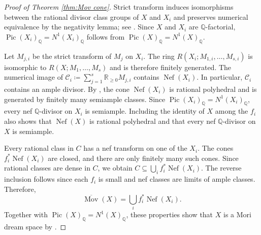 \documentclass[a4paper,12pt]{amsart}
\theoremstyle{plain}
\theoremstyle{definition}
\numberwithin{equation}{section}
\newcommand{\R}{\mathbb{R}}
\newcommand{\Q}{\mathbb{Q}}
\DeclareMathOperator{\Nef}{Nef}
\def\Pic{\operatorname{Pic}}
\def\Mov{\operatorname{Mov}}
\begin{document}
\begin{proof}[Proof of Theorem \ref{thm:Mov cone}]
    Strict transform induces isomorphisms between the rational divisor class groups of $X$ and $X_i$ and preserves numerical equivalence by the negativity lemma; see \cite[Corollary 2.6]{KKL}. Since $X$ and $X_i$ are $\Q$-factorial, $\Pic(X_i)_{\Q}=N^1(X_i)_{\Q}$ follows from $\Pic(X)_{\Q}=N^1(X)_{\Q}$.

    Let $M_{j,i}$ be the strict transform of $M_j$ on $X_i$. The ring $R(X_i;M_{1,i},\ldots,M_{s,i})$ is isomorphic to $R(X;M_1,\ldots,M_s)$ and is therefore finitely generated. The numerical image of $\mathcal C_i\coloneqq\sum_{j=1}^s\R_{\ge0}M_{j,i}$ contains $\Nef(X_i)$. In particular, $\mathcal C_i$ contains an ample divisor. By \cite[Corollary 3.4]{KKL}, the cone $\Nef(X_i)$ is rational polyhedral and is generated by finitely many semiample classes. Since $\Pic(X_i)_{\Q}=N^1(X_i)_{\Q}$, every nef $\Q$-divisor on $X_i$ is semiample. Including the identity of $X$ among the $f_i$ also shows that $\Nef(X)$ is rational polyhedral and that every nef $\Q$-divisor on $X$ is semiample.

    Every rational class in $C$ has a nef transform on one of the $X_i$. The cones $f_i^*\Nef(X_i)$ are closed, and there are only finitely many such cones. Since rational classes are dense in $C$, we obtain $C\subseteq\bigcup_i f_i^*\Nef(X_i)$. The reverse inclusion follows since each $f_i$ is small and nef classes are limits of ample classes. Therefore,
    \[
    \overline{\Mov}(X)=\bigcup_i f_i^*\Nef(X_i).
    \]
    Together with $\Pic(X)_{\Q}=N^1(X)_{\Q}$, these properties show that $X$ is a Mori dream space by \cite[Definition 1.10]{HK}.
\end{proof}



\end{document}
